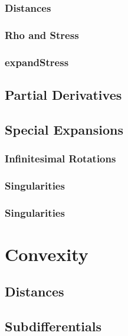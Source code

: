 \documentclass[
  12pt,
]{book}
\begin{document}
\subsubsection{Distances}\label{distances}

\subsubsection{Rho and Stress}\label{secrhostress}

\subsubsection{expandStress}\label{expandstress}

\subsection{Partial Derivatives}\label{partial-derivatives}

\subsection{Special Expansions}\label{propspecexp}

\subsubsection{Infinitesimal Rotations}\label{infinitesimal-rotations}

\subsubsection{Singularities}\label{singularities}

\subsubsection{Singularities}\label{singularities-1}

\section{Convexity}\label{propconvex}

\subsection{Distances}\label{distances-1}

\subsection{Subdifferentials}\label{subdifdef}
\end{document}
